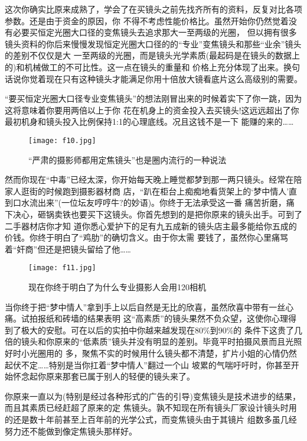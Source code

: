 ﻿\documentclass[12pt,a4paper,onecolumn]{article}
\begin{document}
这次你确实比原来成熟了，学会了在买镜头之前先找齐所有的资料，反复对比各项参数。还是由于资金的原因，你
不得不考虑性能价格比。虽然开始你仍然觉着没有必要买恒定光圈大口径的变焦镜头去追求那大一至两级的光圈，
但以拥有很多镜头资料的你后来慢慢发现恒定光圈大口径的的“专业”变焦镜头和那些“业余”镜头的差别不仅仅是大
一至两级的光圈，而是镜头光学素质(最起码是在镜头的数据上的)和机械做工的不可比性。这一点在镜头的重量和
价格上充分体现了出来。换句话说你觉着现在只有这种镜头才能满足你用十倍放大镜看底片这么高级别的需要。

“要买恒定光圈大口径专业变焦镜头”的想法刚冒出来的时候着实下了你一跳，因为这将意味着你要用两倍以上于你
花在机身上的资金投入去买镜头!这远远超出了你最初机身和镜头投入比例保持1:1的心理底线。况且这钱不是一下
能赚的来的……

\begin{wrapfigure}{l}{0.3\textwidth}
\vspace{-2ex}
\texttt{[image: f10.jpg]}
\caption{“严肃的摄影师都用定焦镜头”也是圈内流行的一种说法}
\vspace{-2ex}
\end{wrapfigure}

然而你现在“中毒”已经太深，你开始每天晚上睡觉都梦到那一两只镜头。经常在陪家人逛街的时候跑到摄影器材商
店，“趴在柜台上痴痴地看货架上的‘梦中情人’直到口水流出来”(一位坛友哼哼牛?的妙语)。你终于无法承受这一番
痛苦折磨，痛下决心，砸锅卖铁也要买下这镜头。你首先想到的是把你原来的镜头出手。可到了二手器材店你才知
道你悉心爱护下的足有九五成新的镜头店主最多能给你五成的价钱。你终于明白了“鸡肋”的确切含义。由于你太需
要钱了，虽然你心里痛骂着“奸商”但还是把镜头留给了他……

\begin{wrapfigure}{r}{0.3\textwidth}
\vspace{-2ex}
\texttt{[image: f11.jpg]}
\caption{现在你终于明白了为什么专业摄影人会用120相机}
\vspace{-2ex}
\end{wrapfigure}

当你终于把“梦中情人”拿到手上以后自然是无比的欣喜，虽然欣喜中带有一丝心痛。试拍报纸和砖墙的结果表明
这“高素质”的镜头果然不负众望，这使你心理得到了极大的安慰。可在以后的实拍中你越来越发现在80\%到90\%的
条件下这贵了几倍的镜头和你原来的“低素质”镜头并没有明显的差别。毕竟平时拍摄风景而且光照好时小光圈用的
多，聚焦不实的时候用什么镜头都不清楚，扩片小姐的心情仍然起伏不定……特别是当你扛着“梦中情人”翻过一个山
坡累的气喘吁吁时，你甚至开始怀念起你原来那套已属于别人的轻便的镜头来了。


你原来一直以为(特别是经过各种形式的广告的引导)变焦镜头是技术进步的结果，而且其素质已经赶超了原来的定
焦镜头。孰不知现在所有镜头厂家设计镜头时用的还是数十年前甚至上百年前的光学公式，而变焦镜头由于其镜片
组数多虽几经努力还不能做到像定焦镜头那样好。
\end{document}

